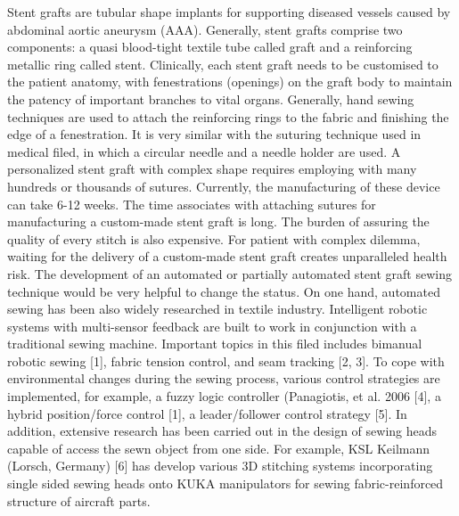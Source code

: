 Stent grafts are tubular shape implants for supporting diseased vessels caused by abdominal aortic aneurysm (AAA). Generally, stent grafts comprise two components: a quasi blood-tight textile tube called graft and a reinforcing metallic ring called stent. Clinically, each stent graft needs to be customised to the patient anatomy, with fenestrations (openings) on the graft body to maintain the patency of important branches to vital organs. Generally, hand sewing techniques are used to attach the reinforcing rings to the fabric and finishing the edge of a fenestration. It is very similar with the suturing technique used in medical filed, in which a circular needle and a needle holder are used. A personalized stent graft with complex shape requires employing with many hundreds or thousands of sutures.  Currently, the manufacturing of these device can take 6-12 weeks. The time associates with attaching sutures for manufacturing a custom-made stent graft is long. The burden of assuring the quality of every stitch is also expensive. For patient with complex dilemma, waiting for the delivery of a custom-made stent graft creates unparalleled health risk. The development of an automated or partially automated stent graft sewing technique would be very helpful to change the status.
On one hand, automated sewing has been also widely researched in textile industry. Intelligent robotic systems with multi-sensor feedback are built to work in conjunction with a traditional sewing machine. Important topics in this filed includes bimanual robotic sewing [1], fabric tension control, and seam tracking [2, 3]. To cope with environmental changes during the sewing process, various control strategies are implemented, for example, a fuzzy logic controller (Panagiotis, et al. 2006 [4], a hybrid position/force control [1], a leader/follower control strategy [5]. In addition, extensive research has been carried out in the design of sewing heads capable of access the sewn object from one side. For example, KSL Keilmann (Lorsch, Germany) [6] has develop various 3D stitching systems incorporating single sided sewing heads onto KUKA manipulators for sewing fabric-reinforced structure of aircraft parts.
